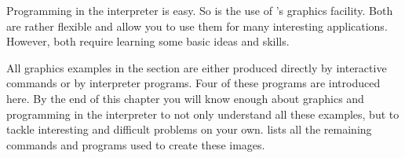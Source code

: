 
%
%
%
%
%


Programming in the interpreter is easy.
So is the use of \Language{}'s graphics facility.
Both are rather flexible and allow you to use them for many
interesting applications.
However, both require learning some basic ideas and skills.

All graphics examples in the \Gallery{} section are either
produced directly by interactive commands or by interpreter
programs.
Four of these programs are introduced here.
By the end of this chapter you will know enough about graphics and
programming in the interpreter to not only understand all these
examples, but to tackle interesting and difficult problems on your
own.
 lists all the remaining commands and
programs used to create these images.

